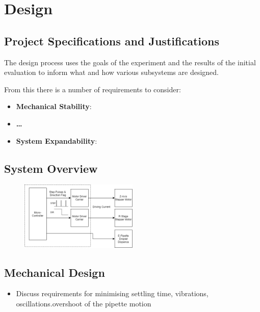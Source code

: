 \chapter{Design}\label{C:design}

\section{Project Specifications and Justifications}

The design process uses the goals of the experiment and the results of the initial evaluation to inform what and how various subsystems are designed.

From this there is a number of requirements to consider:

\begin{itemize}
    \item \textbf{Mechanical Stability}:
    \item \textbf{\dots}
    \item \textbf{System Expandability}:
\end{itemize}

\section{System Overview}

\begin{figure}[h]
    \begin{center}
        \includegraphics[width=0.5\textwidth]{img/ED_block_diag.png}
    \end{center}
\end{figure}

\section{Mechanical Design}

\begin{itemize}
    \item Discuss requirements for minimising settling time, vibrations, oscillations.overshoot of the pipette motion 
\end{itemize}

